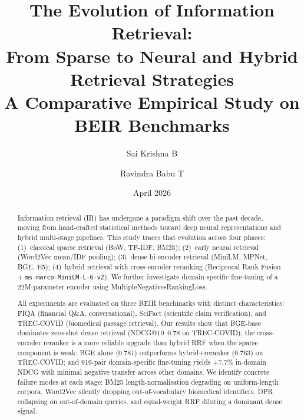 \documentclass[12pt, a4paper]{article}
\makeatletter
\newcommand{\ndcg}{NDCG@10}
\newcommand{\tc}{TREC-COVID}
\newcommand{\fiqa}{FIQA}
\newcommand{\scifact}{SciFact}
\makeatother
\begin{document}

\title{%
  \textbf{The Evolution of Information Retrieval:}\\
  From Sparse to Neural and Hybrid Retrieval Strategies\\[6pt]
  \large A Comparative Empirical Study on BEIR Benchmarks
}
\author{Sai Krishna B \and Ravindra Babu T}
\date{April 2026}

\maketitle

\begin{abstract}
Information retrieval (IR) has undergone a paradigm shift over the past decade,
moving from hand-crafted statistical methods toward deep neural representations
and hybrid multi-stage pipelines.  This study traces that evolution across four
phases: (1)~classical sparse retrieval (BoW, TF-IDF, BM25); (2)~early neural
retrieval (Word2Vec mean/IDF pooling); (3)~dense bi-encoder retrieval (MiniLM,
MPNet, BGE, E5); (4)~hybrid retrieval with cross-encoder reranking (Reciprocal
Rank Fusion + \texttt{ms-marco-MiniLM-L-6-v2}).  We further investigate
domain-specific fine-tuning of a 22M-parameter encoder using
MultipleNegativesRankingLoss.

All experiments are evaluated on three BEIR benchmarks with distinct
characteristics: \fiqa{} (financial Q\&A, conversational), \scifact{}
(scientific claim verification), and \tc{} (biomedical passage retrieval).
Our results show that BGE-base dominates zero-shot dense retrieval
(\ndcg{}~0.78 on \tc{}); the cross-encoder reranker is a more reliable upgrade
than hybrid RRF when the sparse component is weak: BGE alone (0.781)
outperforms hybrid+reranker (0.763) on \tc{}; and 919-pair domain-specific
fine-tuning yields +7.7\% in-domain NDCG with minimal negative transfer across
other domains.  We identify concrete failure modes at each stage: BM25
length-normalisation degrading on uniform-length corpora, Word2Vec silently
dropping out-of-vocabulary biomedical identifiers, DPR collapsing on
out-of-domain queries, and equal-weight RRF diluting a dominant dense signal.
\end{abstract}

\tableofcontents
\newpage
\end{document}
